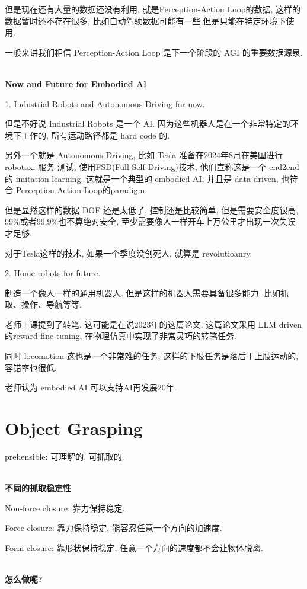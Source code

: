 但是现在还有大量的数据还没有利用, 就是Perception-Action Loop的数据, 
这样的数据暂时还不存在很多, 比如自动驾驶数据可能有一些,但是只能在特定环境下使用.

一般来讲我们相信 Perception-Action Loop 是下一个阶段的 AGI 的重要数据源泉.

\textbf{\\Now and Future for Embodied Al}

1. Industrial Robots and Autonomous Driving for now.

但是不好说 Industrial Robots 是一个 AI. 因为这些机器人是在一个非常特定的环境下工作的, 
所有运动路径都是 hard code 的.

另外一个就是 Autonomous Driving, 比如 Tesla 准备在2024年8月在美国进行 robotaxi 服务
测试, 使用FSD(Full Self-Driving)技术, 他们宣称这是一个 end2end 的 imitation learning.
这就是一个典型的 embodied AI, 并且是 data-driven, 也符合 Perception-Action Loop的paradigm.

但是显然这样的数据 DOF 还是太低了, 控制还是比较简单, 但是需要安全度很高, 
99\%或者99.9\%也不算绝对安全,
至少需要像人一样开车上万公里才出现一次失误才足够.

对于Tesla这样的技术, 如果一个季度没创死人, 就算是 revolutioanry.

2. Home robots for future.

制造一个像人一样的通用机器人. 但是这样的机器人需要具备很多能力, 比如抓取、操作、导航等等.

老师上课提到了转笔, 这可能是在说2023年的这篇论文\cite{ma2023eureka}, 这篇论文采用
LLM driven的reward fine-tuning, 在物理仿真中实现了非常灵巧的转笔任务.

同时 locomotion 这也是一个非常难的任务, 这样的下肢任务是落后于上肢运动的, 容错率也很低.

老师认为 embodied AI 可以支持AI再发展20年.

\section{Object Grasping}

prehensible: 可理解的, 可抓取的.

\textbf{\\不同的抓取稳定性}

Non-force closure: 靠力保持稳定.

Force closure: 靠力保持稳定, 能容忍任意一个方向的加速度.

Form closure: 靠形状保持稳定, 任意一个方向的速度都不会让物体脱离.

\textbf{\\怎么做呢?}

